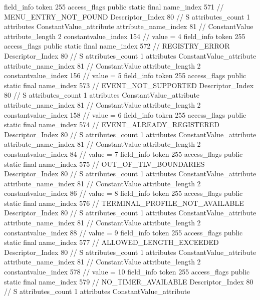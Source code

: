 {{{{{{{				}
				}
			}
			field_info {
				token	255
				access_flags	public static final
				name_index	571		// MENU_ENTRY_NOT_FOUND
				Descriptor_Index	80		// S
				attributes_count	1
				attributes {
				ConstantValue_attribute {
					attribute_name_index	81		// ConstantValue
					attribute_length	2
					constantvalue_index	154		// value = 4
				}
				}
			}
			field_info {
				token	255
				access_flags	public static final
				name_index	572		// REGISTRY_ERROR
				Descriptor_Index	80		// S
				attributes_count	1
				attributes {
				ConstantValue_attribute {
					attribute_name_index	81		// ConstantValue
					attribute_length	2
					constantvalue_index	156		// value = 5
				}
				}
			}
			field_info {
				token	255
				access_flags	public static final
				name_index	573		// EVENT_NOT_SUPPORTED
				Descriptor_Index	80		// S
				attributes_count	1
				attributes {
				ConstantValue_attribute {
					attribute_name_index	81		// ConstantValue
					attribute_length	2
					constantvalue_index	158		// value = 6
				}
				}
			}
			field_info {
				token	255
				access_flags	public static final
				name_index	574		// EVENT_ALREADY_REGISTERED
				Descriptor_Index	80		// S
				attributes_count	1
				attributes {
				ConstantValue_attribute {
					attribute_name_index	81		// ConstantValue
					attribute_length	2
					constantvalue_index	84		// value = 7
				}
				}
			}
			field_info {
				token	255
				access_flags	public static final
				name_index	575		// OUT_OF_TLV_BOUNDARIES
				Descriptor_Index	80		// S
				attributes_count	1
				attributes {
				ConstantValue_attribute {
					attribute_name_index	81		// ConstantValue
					attribute_length	2
					constantvalue_index	86		// value = 8
				}
				}
			}
			field_info {
				token	255
				access_flags	public static final
				name_index	576		// TERMINAL_PROFILE_NOT_AVAILABLE
				Descriptor_Index	80		// S
				attributes_count	1
				attributes {
				ConstantValue_attribute {
					attribute_name_index	81		// ConstantValue
					attribute_length	2
					constantvalue_index	88		// value = 9
				}
				}
			}
			field_info {
				token	255
				access_flags	public static final
				name_index	577		// ALLOWED_LENGTH_EXCEEDED
				Descriptor_Index	80		// S
				attributes_count	1
				attributes {
				ConstantValue_attribute {
					attribute_name_index	81		// ConstantValue
					attribute_length	2
					constantvalue_index	578		// value = 10
				}
				}
			}
			field_info {
				token	255
				access_flags	public static final
				name_index	579		// NO_TIMER_AVAILABLE
				Descriptor_Index	80		// S
				attributes_count	1
				attributes {
				ConstantValue_attribute {
}}}}}}}
